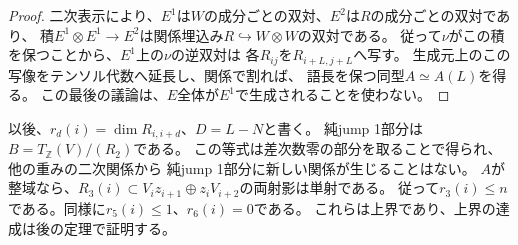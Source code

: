 \documentclass[11pt,a4paper]{ltjsarticle}
\theoremstyle{definition}
\begin{document}
\begin{proof}
二次表示により、$E^1$は$W$の成分ごとの双対、$E^2$は$R$の成分ごとの双対であり、
積$E^1\otimes E^1\to E^2$は関係埋込み$R\hookrightarrow W\otimes W$の双対である。
従って$\nu$がこの積を保つことから、$E^1$上の$\nu$の逆双対は
各$R_{ij}$を$R_{i+L,j+L}$へ写す。
生成元上のこの写像をテンソル代数へ延長し、関係で割れば、
語長を保つ同型$A\simeq A(L)$を得る。
この最後の議論は、$E$全体が$E^1$で生成されることを使わない。
\end{proof}

以後、$r_d(i)=\dim R_{i,i+d}$、$D=L-N$と書く。
純jump 1部分は$B=T_{\mathbb Z}(V)/(R_2)$である。
この等式は差次数零の部分を取ることで得られ、他の重みの二次関係から
純jump 1部分に新しい関係が生じることはない。
$A$が整域なら、$R_3(i)\subset V_i z_{i+1}\oplus z_iV_{i+2}$の両射影は単射である。
従って$r_3(i)\le n$である。同様に$r_5(i)\le1$、$r_6(i)=0$である。
これらは上界であり、上界の達成は後の定理で証明する。
\end{document}
